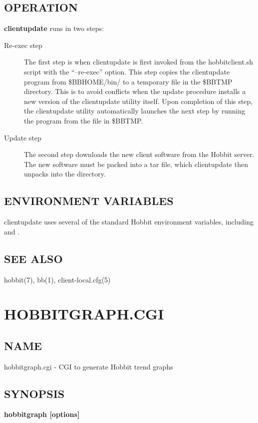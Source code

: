\subsection{OPERATION}
\textbf{clientupdate}
 runs in two steps: 

 \begin{description}
\item[Re-exec step] The first step is when clientupdate is first invoked from the hobbitclient.sh script with the ``--re-exec'' option. This step copies the clientupdate program from \$BBHOME/bin/ to a temporary file in the \$BBTMP directory. This is to avoid conflicts when the update procedure installs a new version of the clientupdate utility itself. Upon completion of this step, the clientupdate utility automatically launches the next step by running the program from the file in \$BBTMP. 

 

\item[Update step] The second step downloads the new client software from the Hobbit server. The new software must be packed into a tar file, which clientupdate then unpacks into the  directory. 

 


\end{description}

\subsection{ENVIRONMENT VARIABLES}
 clientupdate uses several of the standard Hobbit environment variables, including 
 and 
. 

 
\subsection{SEE ALSO}
hobbit(7), bb(1), client-local.cfg(5) 

%
\newpage
\section{HOBBITGRAPH.CGI}


\subsection{NAME}
 hobbitgraph.cgi - CGI to generate Hobbit trend graphs \subsection{SYNOPSIS}
\textbf{hobbitgraph [options]}


